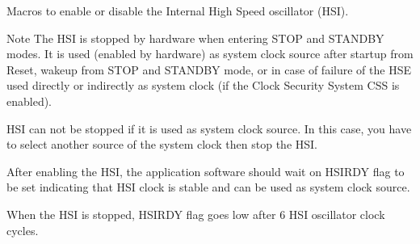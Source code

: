 Macros to enable or disable the Internal High Speed oscillator (H\+SI). 

\begin{DoxyNote}{Note}
The H\+SI is stopped by hardware when entering S\+T\+OP and S\+T\+A\+N\+D\+BY modes. It is used (enabled by hardware) as system clock source after startup from Reset, wakeup from S\+T\+OP and S\+T\+A\+N\+D\+BY mode, or in case of failure of the H\+SE used directly or indirectly as system clock (if the Clock Security System C\+SS is enabled).

H\+SI can not be stopped if it is used as system clock source. In this case, you have to select another source of the system clock then stop the H\+SI.

After enabling the H\+SI, the application software should wait on H\+S\+I\+R\+DY flag to be set indicating that H\+SI clock is stable and can be used as system clock source.

When the H\+SI is stopped, H\+S\+I\+R\+DY flag goes low after 6 H\+SI oscillator clock cycles. 
\end{DoxyNote}
